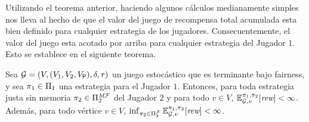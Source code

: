 



Utilizando el teorema anterior, haciendo algunos cálculos medianamente simples nos lleva al hecho de que el valor del juego de recompensa total acumulada esta bien definido para cualquier estrategia de los jugadores.
%
Consecuentemente, el valor del juego esta acotado por arriba para cualquier estrategia del Jugador $1$.
%
Esto se establece en el siguiente teorema.

\begin{theorem}\label{th:memoryless-strat-p2-bounded-expectation}
  Sea $\mathcal{G}= (V, (V_1, V_2, V_{\mathsf{P}}), \delta, \mathit{r})$ un
  juego estocástico que es terminante bajo fairness, y sea
  $\pi_{1} \in \Pi_{1}$ una estrategia para el Jugador $1$.
  Entonces, para toda estrategia justa sin memoria
  $\pi_{2} \in \Pi^{\textit{M}\mathcal{F}}_{2}$ del Jugador $2$
  y para todo $v \in V$,
  $\mathbb{E}^{\pi_{1}, \pi_{2}}_{\mathcal{G},v}[\textit{rew}] < \infty$.
  Además, para todo vértice $v \in V$,
  $\inf_{\pi_{2} \in \Pi^{\mathcal{F}}_{2}} \mathbb{E}^{\pi_{1}, \pi_{2}}_{\mathcal{G},v}[\textit{rew}] < \infty$.
\end{theorem}

